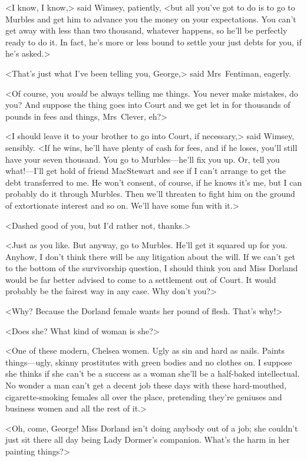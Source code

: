 <I know, I know,> said Wimsey, patiently, <but all you've got to do is to go to Murbles and get him to advance you the money on your expectations. You can't get away with less than two thousand, whatever happens, so he'll be perfectly ready to do it. In fact, he's more or less bound to settle your just debts for you, if he's asked.>

<That's just what I've been telling you, George,> said Mrs~Fentiman, eagerly.

<Of course, you \emph{would} be always telling me things. You never make mistakes, do you? And suppose the thing goes into Court and we get let in for thousands of pounds in fees and things, Mrs~Clever, eh?>

<I should leave it to your brother to go into Court, if necessary,> said Wimsey, sensibly. <If he wins, he'll have plenty of cash for fees, and if he loses, you'll still have your seven thousand. You go to Murbles—he'll fix you up. Or, tell you what!—I'll get hold of friend MacStewart and see if I can't arrange to get the debt transferred to me. He won't consent, of course, if he knows it's me, but I can probably do it through Murbles. Then we'll threaten to fight him on the ground of extortionate interest and so on. We'll have some fun with it.>

<Dashed good of you, but I'd rather not, thanks.>

<Just as you like. But anyway, go to Murbles. He'll get it squared up for you. Anyhow, I don't think there will be any litigation about the will. If we can't get to the bottom of the survivorship question, I should think you and Miss Dorland would be far better advised to come to a settlement out of Court. It would probably be the fairest way in any case. Why don't you?>

<Why? Because the Dorland female wants her pound of flesh. That's why!>

<Does she? What kind of woman is she?>

<One of these modern, Chelsea women. Ugly as sin and hard as nails. Paints things—ugly, skinny prostitutes with green bodies and no clothes on. I suppose she thinks if she can't be a success as a woman she'll be a half-baked intellectual. No wonder a man can't get a decent job these days with these hard-mouthed, cigarette-smoking females all over the place, pretending they're geniuses and business women and all the rest of it.>

<Oh, come, George! Miss Dorland isn't doing anybody out of a job; she couldn't just sit there all day being Lady Dormer's companion. What's the harm in her painting things?>

